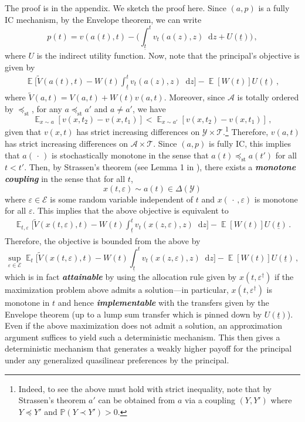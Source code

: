 \documentclass[12pt,letterpaper]{article}
\newenvironment{original}{\color{black}\noindent}{}
\theoremstyle{plain}
\theoremstyle{definition}
\theoremstyle{remark}
\DeclareMathOperator{\E}{\mathds{E}}
\renewcommand{\P}{\mathds{P}}
\newcommand{\Y}{\mathcal{Y}}
\renewcommand{\1}{\mathds{1}}
\renewcommand{\epsilon}{\varepsilon}
\renewcommand*\d{\mathop{}\!\mathrm{d}}
\theoremstyle{definition}
\begin{document}
\begin{original}
The proof is in the appendix. We sketch the proof here. Since $(a, p)$ is a fully IC mechanism, by the Envelope theorem, we can write
\[p(t) = v(a(t), t) - \Big(\int_{\underline{t}}^t v_t(a(z), z) \d z + U(\underline{t})\Big)\,,\]
where $U$ is the indirect utility function. Now, note that the principal's objective is given by
\begin{align*}
\E\Bigg[\widetilde{V}(a(t), t) - W(t) \int_{\underline{t}}^t v_t(a(z), z) \d z \Bigg] - \E[W(t)] U(\underline{t})\,,
\end{align*}
where $\widetilde{V}(a, t) = V(a, t) + W(t)v(a, t)$. Moreover, since $\mathcal{A}$ is totally ordered by $\preceq_{\text{st}}$, for any $a \preceq_{\text{st}} a'$ and $a \neq a'$, we have
\[ \E_{x \sim a}[v(x, t_2) - v(x, t_1)] < \E_{x \sim a'}[v(x, t_2) - v(x, t_1)]\,,\]
given that $v(x, t)$ has strict increasing differences on $\mathcal{Y} \times \mathcal{T}$.\footnote{Indeed, to see the above must hold with strict inequality, note that by Strassen's theorem $a'$ can be obtained from $a$ via a coupling $(Y, Y')$ where $Y \preceq Y'$ and $\P(Y \prec Y') > 0$.} Therefore, $v(a, t)$ has strict increasing differences on $\mathcal{A} \times \mathcal{T}$. Since $(a, p)$ is fully IC, this implies that $a(\,\cdot\,)$ is stochastically monotone in the sense that $a(t) \preceq_{\text{st}} a(t')$ for all $t < t'$. Then, by Strassen's theorem (see Lemma 1 in \citealt{yang2022costly}), there exists a \textit{\textbf{monotone coupling}} in the sense that for all $t$,
\[x(t, \epsilon) \sim a(t) \in \Delta(\Y)\]
where $\epsilon \in \mathcal{E}$ is some random variable independent of $t$ and $x(\,\cdot\,, \epsilon)$ is monotone for all $\varepsilon$. This implies that the above objective is equivalent to
\begin{align*}
\E_{t, \epsilon}\Bigg[\widetilde{V}(x(t, \varepsilon), t) - W(t) \int_{\underline{t}}^t v_t(x(z, \varepsilon), z) \d z \Bigg] - \E[W(t)] U(\underline{t})\,.
\end{align*}
Therefore, the objective is bounded from the above by
\[\sup_{\varepsilon \in \mathcal{E}}\E_{t}\Bigg[\widetilde{V}(x(t, \varepsilon), t) - W(t) \int_{\underline{t}}^t v_t(x(z, \varepsilon), z) \d z \Bigg] - \E[W(t)] U(\underline{t})\,,\]
which is in fact \textit{\textbf{attainable}} by using the allocation rule given by $x(t, \epsilon^\dagger)$ if the maximization problem above admits a solution---in particular, $x(t, \epsilon^\dagger)$ is monotone in $t$ and hence \textit{\textbf{implementable}} with the transfers given by the Envelope theorem (up to a lump sum transfer which is pinned down by $U(\underline{t})$). Even if the above maximization does not admit a solution, an approximation argument suffices to yield such a deterministic mechanism. This then gives a deterministic mechanism that generates a weakly higher payoff for the principal under any generalized quasilinear preferences by the principal.
\end{original}
\end{document}
